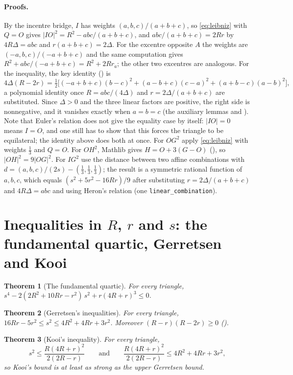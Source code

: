 \documentclass[11pt]{article}
\newtheorem{theorem}{Theorem}
\theoremstyle{definition}
\theoremstyle{remark}
\newcommand{\lean}[1]{\texttt{#1}}
\begin{document}
\paragraph{Proofs.} By the incentre bridge, $I$ has weights $(a,b,c)/(a+b+c)$, so
\eqref{eq:leibniz} with $Q=O$ gives $|IO|^2=R^2-abc/(a+b+c)$, and $abc/(a+b+c)=2Rr$ by $4R\Delta=abc$
and $r(a+b+c)=2\Delta$. For the excentre opposite $A$ the weights are $(-a,b,c)/(-a+b+c)$ and the
same computation gives $R^2+abc/(-a+b+c)=R^2+2Rr_a$; the other two excentres are analogous. For the
inequality, the key identity () is
\[
4\Delta(R-2r)=\tfrac12\bigl[(-a+b+c)(b-c)^2+(a-b+c)(c-a)^2+(a+b-c)(a-b)^2\bigr],
\]
a polynomial identity once $R=abc/(4\Delta)$ and $r=2\Delta/(a+b+c)$ are substituted. Since
$\Delta>0$ and the three linear factors are positive, the right side is nonnegative, and it vanishes
exactly when $a=b=c$ (the auxiliary lemmas  and
). Note that Euler's relation does not give the equality case
by itself: $|IO|=0$ means $I=O$, and one still has to show that this forces the triangle to be
equilateral; the identity above does both at once. For $OG^2$ apply \eqref{eq:leibniz} with weights
$\tfrac13$ and $Q=O$. For $OH^2$, Mathlib gives $H=O+3(G-O)$
(), so $|OH|^2=9|OG|^2$. For
$IG^2$ use the distance between two affine combinations with $d=(a,b,c)/(2s)-(\tfrac13,\tfrac13,\tfrac13)$;
the result is a symmetric rational function of $a,b,c$, which equals $(s^2+5r^2-16Rr)/9$ after substituting
$r=2\Delta/(a+b+c)$ and $4R\Delta=abc$ and using Heron's relation (one \lean{linear\_combination}).
\section{Inequalities in $R$, $r$ and $s$: the fundamental quartic, Gerretsen and Kooi}\label{sec:rrs}
\begin{theorem}[The fundamental quartic]\label{thm:quartic}
For every triangle,
$s^4-2(2R^2+10Rr-r^2)\,s^2+r(4R+r)^3\le0$.
\end{theorem}
\begin{theorem}[Gerretsen's inequalities]\label{thm:gerretsen}
For every triangle, $16Rr-5r^2\le s^2\le 4R^2+4Rr+3r^2$. Moreover
$(R-r)(R-2r)\ge0$ ().
\end{theorem}
\begin{theorem}[Kooi's inequality]\label{thm:kooi}
For every triangle,
\[
s^2\le\frac{R(4R+r)^2}{2(2R-r)}\qquad\text{and}\qquad \frac{R(4R+r)^2}{2(2R-r)}\le 4R^2+4Rr+3r^2,
\]
so Kooi's bound is at least as strong as the upper Gerretsen bound.
\end{theorem}
\end{document}
